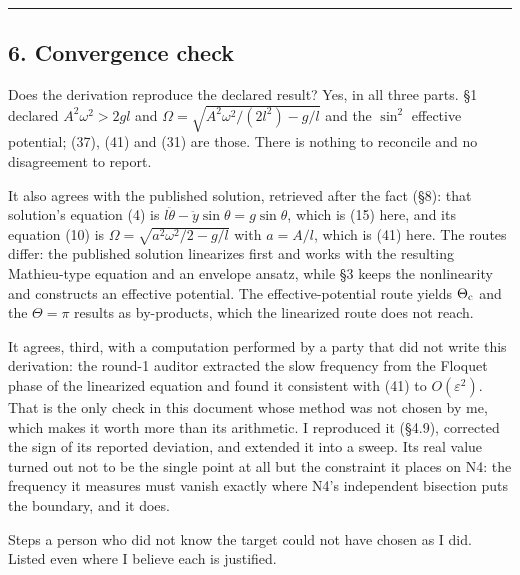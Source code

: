 \documentclass[11pt,a4paper]{article}
\begin{document}
\begin{center}\rule{0.5\linewidth}{0.5pt}\end{center}

\hypertarget{convergence-check}{%
\subsection{6. Convergence check}\label{convergence-check}}

Does the derivation reproduce the declared result? Yes, in all three parts.
§1 declared \(A^2\omega^2>2gl\) and
\(\Omega=\sqrt{A^2\omega^2/(2l^2)-g/l}\) and the \(\sin^2\) effective potential;
(37), (41) and (31) are those. There is nothing to reconcile and no
disagreement to report.

It also agrees with the published solution, retrieved after the fact (§8): that
solution's equation (4) is \(l\ddot\theta-\ddot y\sin\theta=g\sin\theta\), which is
(15) here, and its equation (10) is \(\Omega=\sqrt{a^2\omega^2/2-g/l}\) with
\(a=A/l\), which is (41) here. The routes differ: the published solution
linearizes first and works with the resulting Mathieu-type equation and an
envelope ansatz, while §3 keeps the nonlinearity and constructs an effective
potential. The effective-potential route yields \(\Theta_{\rm c}\) and the
\(\Theta=\pi\) results as by-products, which the linearized route does not reach.

It agrees, third, with a computation performed by a party that did not write
this derivation: the round-1 auditor extracted the slow frequency from the
Floquet phase of the linearized equation and found it consistent with (41) to
\(O(\varepsilon^2)\). That is the only check in this document whose method was
not chosen by me, which makes it worth more than its arithmetic. I reproduced it
(§4.9), corrected the sign of its reported deviation, and extended it into a
sweep. Its real value turned out not to be the single point at all but the
constraint it places on N4: the frequency it measures must vanish exactly where
N4's independent bisection puts the boundary, and it does.

Steps a person who did not know the target could not have chosen as I did.
Listed even where I believe each is justified.
\end{document}
